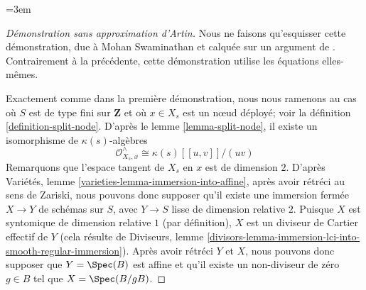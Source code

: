 \begingroup\emergencystretch=3em
\begin{proof}[Démonstration sans approximation d'Artin] Nous ne faisons qu'esquisser cette démonstration, due à Mohan Swaminathan et calquée sur un argument de \cite[Proposition X.2.1]{ACG}. Contrairement à la précédente, cette démonstration utilise les équations elles-mêmes.

\medskip\noindent
Exactement comme dans la première démonstration, nous nous ramenons au cas où $S$ est de type fini sur $\mathbf{Z}$ et où $x \in X_s$ est un nœud déployé; voir la définition \ref{definition-split-node}. D'après le lemme \ref{lemma-split-node}, il existe un isomorphisme de $\kappa(s)$-algèbres $$
\mathcal{O}_{X_s, x}^\wedge \cong \kappa(s)[[u, v]]/(uv)
$$ Remarquons que l'espace tangent de $X_s$ en $x$ est de dimension $2$. D'après Variétés, lemme \ref{varieties-lemma-immersion-into-affine}, après avoir rétréci au sens de Zariski, nous pouvons donc supposer qu'il existe une immersion fermée $X \to Y$ de schémas sur $S$, avec $Y \to S$ lisse de dimension relative $2$. Puisque $X$ est syntomique de dimension relative $1$ (par définition), $X$ est un diviseur de Cartier effectif de $Y$ (cela résulte de Diviseurs, lemme \ref{divisors-lemma-immersion-lci-into-smooth-regular-immersion}). Après avoir rétréci $Y$ et $X$, nous pouvons donc supposer que $Y = \Spec(B)$ est affine et qu'il existe un non-diviseur de zéro $g \in B$ tel que $X = \Spec(B/gB)$.


\end{proof}
